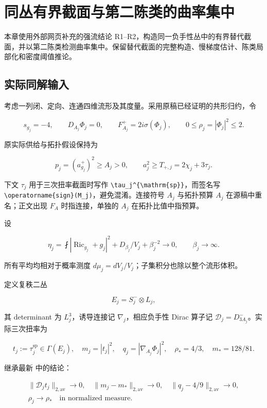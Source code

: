 \documentclass[UTF8,11pt,openany,oneside,fontset=none]{ctexbook}
\begin{document}
\chapter{同丛有界截面与第二陈类的曲率集中}\label{chapter:2}
本章使用外部网页补充的强流结论 R1--R2，构造同一负手性丛中的有界替代截面，并以第二陈类检测曲率集中。保留替代截面的完整构造、慢梯度估计、陈类局部化和密度阈值推论。\cite{R02,Strong}

\section{实际同解输入}\label{ch2:ux5b9eux9645ux540cux89e3ux8f93ux5165}

考虑一列闭、定向、连通四维流形及其度量。采用原稿已经证明的共形归约，令

\[
 s_{g_j}=-4,\qquad D_{A_j}\Phi_j=0,\qquad
 F_{A_j}^{+}=2i\sigma(\Phi_j),\qquad 0\le\rho_j=|\Phi_j|^2\le2.
\]

原实际供给与拓扑假设保持为

\[
 p_j=(a_{g_j}^{+})^2\ge A_j>0,\qquad a_j^2\ge T_{+,j}=2\chi_j+3\tau_j.
\]

下文 \(\tau_j\) 用于三次扭率截面时写作 \texttt{\textbackslash{}tau\_j\^{}\{\textbackslash{}mathrm\{sp\}\}}，而签名写 \texttt{\textbackslash{}operatorname\{sign\}(M\_j)}，避免混淆。连接符号 \(A_j\) 与拓扑预算 \(A_j\) 在源稿中重名；正文出现 \(F_A\) 时指连接，单独的 \(A_j\) 在拓扑比值中指预算。

设

\[
 \eta_j=\fint|\operatorname{Ric}_{g_j}+g_j|^2
       +D_{\beta_j}/V_j+\beta_j^{-2}\longrightarrow0,
 \qquad\beta_j\longrightarrow\infty.
\]

所有平均均相对于概率测度 \(d\mu_j=dV_j/V_j\)；子集积分也除以整个流形体积。

定义复秩二丛

\[
 E_j=S^-_j\otimes L_j,
\]

其 determinant 为 \(L_j^3\)，诱导连接记 \(\nabla_j\)，相应负手性 Dirac 算子记 \(\mathcal D_j=D^-_{3A_j}\)。实际三次扭率为

\[
 t_j:=\tau_j^{\mathrm{sp}}\in\Gamma(E_j),\quad
 m_j=|t_j|^2,\quad q_j=|\nabla_{A_j}\Phi_j|^2,
 \quad \rho_*=4/3,\quad m_*=128/81.
\]

继承最新  中的结论：

\[
 \begin{gathered}
 \|\mathcal D_jt_j\|_{2,\mathrm{av}}\to0,\quad \|m_j-m_*\|_{2,\mathrm{av}}\to0,\quad \|q_j-4/9\|_{2,\mathrm{av}}\to0,\\
 \rho_j\to\rho_*\quad\text{in normalized measure}.
 \end{gathered}
 \tag{2.1}\label{eq:r2:1}
\]
\end{document}
